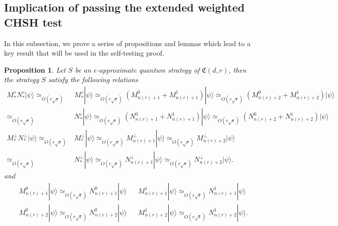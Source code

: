 \documentclass[11pt,letterpaper]{article}
\newcommand{\ket}[1]{|#1\rangle}
\newcommand{\1}{\mathbb{1}}
\newcommand{\nr}{n(r)}
\newcommand{\fC}{\mathfrak{C}}
\newcommand{\ep}{\epsilon}
\newcommand{\se}{\sqrt{\epsilon}}
\newcommand{\appd}[1]{\simeq_{#1}}
\newtheorem{proposition}[theorem]{Proposition}
\theoremstyle{definition}
\begin{document}
\subsection{Implication of passing the extended weighted CHSH test}
\label{sec:imp_chsh}
In this subsection, we prove a series of propositions and lemmas which lead to a key result that will be
used in the self-testing proof.
\begin{proposition}
\label{prop:chsh_base}
Let $S$ be an $\ep$-approximate quantum strategy of $\fC(d,r)$,
then the strategy $S$ satisfy the following relations
\begin{align}
	  M_\ast^\diamond N_\ast^\diamond \ket{\psi}
	  \appd{O( r\se)}&M_\ast^\diamond \ket{\psi} \appd{O( r\se)} (M_{\nr+1}^0+M_{\nr+1}^1)\ket{\psi} \appd{O( r\se)} (M_{\nr+2}^0+M_{\nr+2}^1)\ket{\psi} \\
	  \appd{O( r\se)}&N_\ast^\diamond \ket{\psi} \appd{O( r\se)} (N_{\nr+1}^0+N_{\nr+1}^1)\ket{\psi} \appd{O( r\se)} (N_{\nr+2}^0+N_{\nr+2}^1)\ket{\psi}\\
	M_\ast^\perp N_\ast^\perp\ket{\psi}\appd{O( r\se)} &M_\ast^\perp\ket{\psi} \appd{O( r\se)} M_{\nr+1}^\perp \ket{\psi} \appd{O( r\se)} M_{\nr+2}^\perp \ket{\psi}\\
	\appd{O( r\se)}&N_\ast^\perp\ket{\psi} \appd{O( r\se)} N_{\nr+1}^\perp \ket{\psi} \appd{O( r\se)} N_{\nr+2}^\perp \ket{\psi}.
\end{align}
and
\begin{align}
&M_{\nr+1}^0 \ket{\psi} \appd{O( r\se)} N_{\nr+1}^0 \ket{\psi} && M_{\nr+1}^1\ket{\psi} \appd{O( r\se)} N_{\nr+1}^1 \ket{\psi}\\
&M_{\nr+2}^0 \ket{\psi} \appd{O( r\se)} N_{\nr+2}^0 \ket{\psi} && M_{\nr+2}^1\ket{\psi} \appd{O( r\se)} N_{\nr+2}^1 \ket{\psi}.
\end{align}
\end{proposition}
\end{document}
